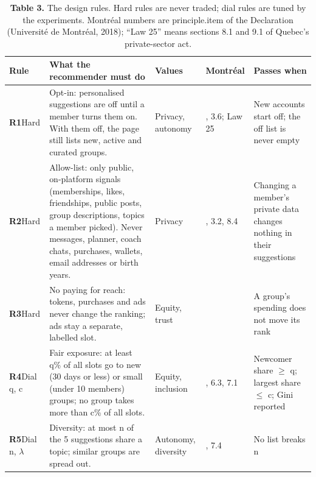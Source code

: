 \documentclass[11pt,letterpaper]{article}
\newcommand{\rowrule}{\midrule[0.2pt]}
\begin{document}
\begin{table}[!htbp]
\centering
\caption*{\textbf{Table 3.} The design rules. Hard rules are never traded; dial rules are tuned by the
experiments. Montréal numbers are principle.item of the Declaration (Université de Montréal, 2018); ``Law 25''
means sections 8.1 and 9.1 of Quebec's private-sector act.}
\scriptsize
\begin{tabular}{
  >{\raggedright\arraybackslash}p{}
  >{\raggedright\arraybackslash}p{}
  >{\raggedright\arraybackslash}p{}
  >{\raggedright\arraybackslash}p{}
  >{\raggedright\arraybackslash}p{}
}
\toprule
\textbf{Rule} & \textbf{What the recommender must do} & \textbf{Values} & \textbf{Montréal} & \textbf{Passes when} \\
\midrule
\textbf{R1}\mbox{}\newline Hard & Opt-in: personalised suggestions are off until a member turns them on. With them off, the page still lists new, active and curated groups. & Privacy, autonomy & 3.4, 3.6; Law 25 & New accounts start off; the off list is never empty \\
\rowrule
\textbf{R2}\mbox{}\newline Hard & Allow-list: only public, on-platform signals (memberships, likes, friendships, public posts, group descriptions, topics a member picked). Never messages, planner, coach chats, purchases, wallets, email addresses or birth years. & Privacy & 3.1, 3.2, 8.4 & Changing a member's private data changes nothing in their suggestions \\
\rowrule
\textbf{R3}\mbox{}\newline Hard & No paying for reach: tokens, purchases and ads never change the ranking; ads stay a separate, labelled slot. & Equity, trust & 6.2 & A group's spending does not move its rank \\
\rowrule
\textbf{R4}\mbox{}\newline Dial q, c & Fair exposure: at least q\% of all slots go to new (30 days or less) or small (under 10 members) groups; no group takes more than c\% of all slots. & Equity, inclusion & 6.2, 6.3, 7.1 & Newcomer share $\geq$ q; largest share $\leq$ c; Gini reported \\
\rowrule
\textbf{R5}\mbox{}\newline Dial n, $\lambda$ & Diversity: at most n of the 5 suggestions share a topic; similar groups are spread out. & Autonomy, diversity & 7.1, 7.4 & No list breaks n \\

\end{tabular}
\end{table}
\end{document}
